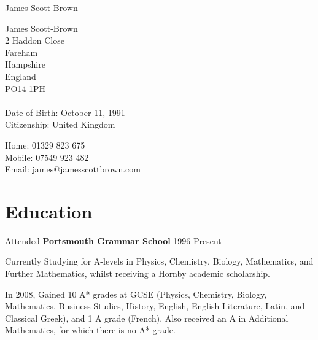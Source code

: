 \documentclass[letterpaper]{article}
\def\name{James Scott-Brown}
\renewenvironment{itemize}{
  \begin{list}{}{
    \setlength{\leftmargin}{1.5em}
  }
}{
  \end{list}
}
\begin{document}
{\huge \name}


\vspace{0.25in}

\begin{minipage}[t]{0.5\textwidth}
James Scott-Brown\\
2 Haddon Close\\
Fareham\\
Hampshire\\
England\\
PO14 1PH\\ \\
Date of Birth: October 11, 1991 \\
Citizenship: United Kingdom
\end{minipage}
\begin{minipage}[t]{0.5\textwidth}
  Home: 01329 823 675 \\
  Mobile: 07549 923 482\\
  Email: james@jamesscottbrown.com \\
\end{minipage}



\section*{Education}
\begin{itemize}
 \item Attended {\bf Portsmouth Grammar School} 1996-Present
 \item Currently Studying for A-levels in Physics, Chemistry, Biology, Mathematics, and Further Mathematics, whilst receiving a Hornby academic scholarship. 
 \item In 2008, Gained 10 A* grades at GCSE (Physics, Chemistry, Biology, Mathematics, Business Studies, History, English, English Literature, Latin, and Classical Greek), and 1 A grade (French). Also received an A in Additional Mathematics, for which there is no A* grade.
\end{itemize}
\end{document}
